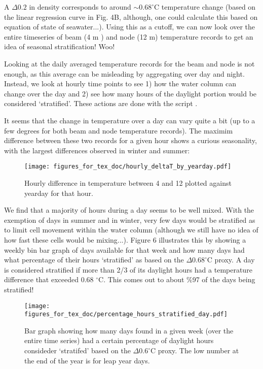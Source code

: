 \documentclass[11pt]{article}
\begin{document}
\clearpage
\noindent A $\Delta0.2$ in density corresponds to around $\sim0.68 ^{\circ}$C temperature change (based on the linear regression curve in Fig. 4B, although, one could calculate this based on equation of state of seawater...). Using this as a cutoff, we can now look over the entire timeseries of beam (4 m ) and node (12 m) temperature records to get an idea of seasonal stratification! Woo!

Looking at the daily averaged temperature records for the beam and node is not enough, as this average can be misleading by aggregating over day and night. Instead, we look at hourly time points to see 1) how the water column can change over the day and 2) see how many hours of the daylight portion would be considered `stratified'. These actions are done with the script .

It seems that the change in temperature over a day can vary quite a bit (up to a few degrees for both beam and node temperature records). The maximim difference between these two records for a given hour shows a curious seasonality, with the largest differences observed in winter and summer:

 \begin{figure}[h]
\centering
\texttt{[image: figures\_for\_tex\_doc/hourly\_deltaT\_by\_yearday.pdf]}
\caption{Hourly difference in temperature between 4 and 12 plotted against yearday for that hour.}
\end{figure}

We find that a majority of hours during a day seems to be well mixed. With the exemption of days in summer and in winter, very few days would be stratified as to limit cell movement within the water column (although we still have no idea of how fast these cells would be mixing...).  Figure 6 illustrates this by showing a weekly bin bar graph of days available for that week and how many days had what percentage of their hours `stratified' as based on the $\Delta0.68 ^{\circ}$C proxy. A day is considered stratified if more than 2/3 of its daylight hours had a temperature difference that exceeded 0.68 $^{\circ}$C. This comes out to about \%97 of the days being stratified!

 \begin{figure}[h]
\centering
\texttt{[image: figures\_for\_tex\_doc/percentage\_hours\_stratified\_day.pdf]}
\caption{Bar graph showing how many days found in a given week (over the entire time series) had a certain percentage of daylight hours consideder `stratifed' based on the $\Delta0.6 ^{\circ}$C proxy. The low number at the end of the year is for leap year days.}
\end{figure}
\end{document}

